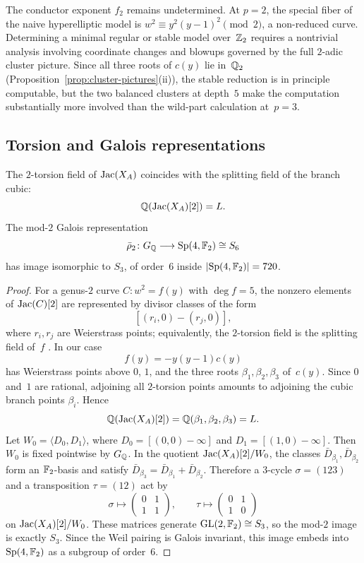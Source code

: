 \begin{remark}\label{rem:f2-obstruction}
The conductor exponent \(f_2\) remains undetermined. At \(p=2\), the special fiber of the naive hyperelliptic model is \(w^2\equiv y^2(y-1)^2\pmod{2}\), a non-reduced curve. Determining a minimal regular or stable model over~\(\mathbb{Z}_2\) requires a nontrivial analysis involving coordinate changes and blowups governed by the full \(2\)-adic cluster picture. Since all three roots of \(c(y)\) lie in~\(\mathbb{Q}_2\) (Proposition~\ref{prop:cluster-pictures}(ii)), the stable reduction is in principle computable, but the two balanced clusters at depth~\(5\) make the computation substantially more involved than the wild-part calculation at~\(p=3\).
\end{remark}

\subsection{Torsion and Galois representations}

\begin{theorem}\label{thm:two-torsion}
The \(2\)-torsion field of \(\operatorname{Jac}(X_A)\) coincides with the splitting field of the branch cubic:
\[
\mathbb{Q}(\operatorname{Jac}(X_A)[2])=L.
\]
The mod-\(2\) Galois representation
\[
\bar\rho_2\colon G_{\mathbb{Q}}\longrightarrow \mathrm{Sp}(4,\mathbb{F}_2)\cong S_6
\]
has image isomorphic to \(S_3\), of order~\(6\) inside \(|\mathrm{Sp}(4,\mathbb{F}_2)|=720\).
\end{theorem}

\begin{proof}
For a genus-\(2\) curve \(C:w^2=f(y)\) with \(\deg f=5\), the nonzero elements of \(\operatorname{Jac}(C)[2]\) are represented by divisor classes of the form
\[
[(r_i,0)-(r_j,0)],
\]
where \(r_i,r_j\) are Weierstrass points; equivalently, the \(2\)-torsion field is the splitting field of~\(f\) \cite[Ch.~2]{CasselsFlynn1996}. In our case
\[
f(y)=-y(y-1)c(y)
\]
has Weierstrass points above \(0\), \(1\), and the three roots \(\beta_1,\beta_2,\beta_3\) of~\(c(y)\). Since \(0\) and~\(1\) are rational, adjoining all \(2\)-torsion points amounts to adjoining the cubic branch points \(\beta_i\). Hence
\[
\mathbb{Q}(\operatorname{Jac}(X_A)[2])=\mathbb{Q}(\beta_1,\beta_2,\beta_3)=L.
\]
Let \(W_0=\langle D_0,D_1\rangle\), where \(D_0=[(0,0)-\infty]\) and \(D_1=[(1,0)-\infty]\). Then \(W_0\) is fixed pointwise by \(G_{\mathbb{Q}}\). In the quotient \(\operatorname{Jac}(X_A)[2]/W_0\), the classes \(\bar D_{\beta_1},\bar D_{\beta_2}\) form an \(\mathbb{F}_2\)-basis and satisfy \(\bar D_{\beta_3}=\bar D_{\beta_1}+\bar D_{\beta_2}\). Therefore a \(3\)-cycle \(\sigma=(123)\) and a transposition \(\tau=(12)\) act by
\[
\sigma\mapsto
\begin{pmatrix}
0&1\\
1&1
\end{pmatrix},
\qquad
\tau\mapsto
\begin{pmatrix}
0&1\\
1&0
\end{pmatrix}
\]
on \(\operatorname{Jac}(X_A)[2]/W_0\). These matrices generate \(\mathrm{GL}(2,\mathbb{F}_2)\cong S_3\), so the mod-\(2\) image is exactly \(S_3\). Since the Weil pairing is Galois invariant, this image embeds into \(\mathrm{Sp}(4,\mathbb{F}_2)\) as a subgroup of order~\(6\).
\end{proof}

